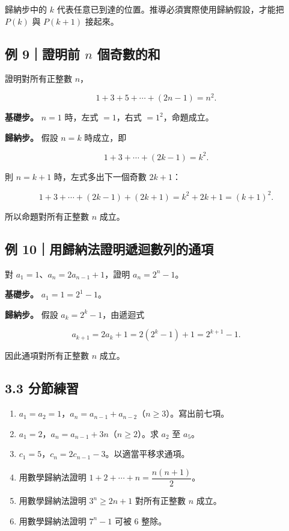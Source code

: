 \documentclass[11pt,a4paper]{article}
\providecommand{\tightlist}{%
  \setlength{\itemsep}{0pt}\setlength{\parskip}{0pt}}
\begin{document}
歸納步中的 \(k\) 代表任意已到達的位置。推導必須實際使用歸納假設，才能把 \(P(k)\) 與 \(P(k+1)\) 接起來。

\subsection{\texorpdfstring{例 9｜證明前 \(n\) 個奇數的和}{例 9｜證明前 n 個奇數的和}}\label{ux4f8b-9ux8b49ux660eux524d-n-ux500bux5947ux6578ux7684ux548c}

證明對所有正整數 \(n\)，

\[
1+3+5+\cdots+(2n-1)=n^2.
\]

\textbf{基礎步。} \(n=1\) 時，左式 \(=1\)，右式 \(=1^2\)，命題成立。

\textbf{歸納步。} 假設 \(n=k\) 時成立，即

\[
1+3+\cdots+(2k-1)=k^2.
\]

則 \(n=k+1\) 時，左式多出下一個奇數 \(2k+1\)：

\[
1+3+\cdots+(2k-1)+(2k+1)
=k^2+2k+1=(k+1)^2.
\]

所以命題對所有正整數 \(n\) 成立。

\subsection{例 10｜用歸納法證明遞迴數列的通項}\label{ux4f8b-10ux7528ux6b78ux7d0dux6cd5ux8b49ux660eux905eux8ff4ux6578ux5217ux7684ux901aux9805}

對 \(a_1=1\)、\(a_n=2a_{n-1}+1\)，證明 \(a_n=2^n-1\)。

\textbf{基礎步。} \(a_1=1=2^1-1\)。

\textbf{歸納步。} 假設 \(a_k=2^k-1\)，由遞迴式

\[
a_{k+1}=2a_k+1=2(2^k-1)+1=2^{k+1}-1.
\]

因此通項對所有正整數 \(n\) 成立。

\subsection{3.3 分節練習}\label{ux5206ux7bc0ux7df4ux7fd2-2}

\begin{enumerate}
\def\labelenumi{\arabic{enumi}.}
\tightlist
\item
  \(a_1=a_2=1\)，\(a_n=a_{n-1}+a_{n-2}\)（\(n\ge3\)）。寫出前七項。
\item
  \(a_1=2\)，\(a_n=a_{n-1}+3n\)（\(n\ge2\)）。求 \(a_2\) 至 \(a_5\)。
\item
  \(c_1=5\)，\(c_n=2c_{n-1}-3\)。以適當平移求通項。
\item
  用數學歸納法證明 \(1+2+\cdots+n=\dfrac{n(n+1)}2\)。
\item
  用數學歸納法證明 \(3^n\ge2n+1\) 對所有正整數 \(n\) 成立。
\item
  用數學歸納法證明 \(7^n-1\) 可被 \(6\) 整除。
\end{enumerate}
\end{document}
